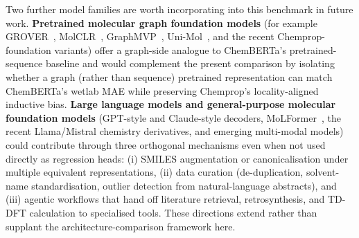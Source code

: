 \documentclass[journal=jcisd8,manuscript=article]{achemso}
\newcommand{\added}[1]{{\color{addedblue}#1}}
\begin{document}
\added{Two further model families are worth incorporating into this benchmark in future work. \textbf{Pretrained molecular graph foundation models} (for example GROVER~\cite{rong2020grover}, MolCLR~\cite{wang2022molecular}, GraphMVP~\cite{liu2021pretraining}, Uni-Mol~\cite{zhou2023unimol}, and the recent Chemprop-foundation variants) offer a graph-side analogue to ChemBERTa's pretrained-sequence baseline and would complement the present comparison by isolating whether a graph (rather than sequence) pretrained representation can match ChemBERTa's wetlab MAE while preserving Chemprop's locality-aligned inductive bias. \textbf{Large language models and general-purpose molecular foundation models} (GPT-style and Claude-style decoders, MoLFormer~\cite{ross2022molformer}, the recent Llama/Mistral chemistry derivatives, and emerging multi-modal models) could contribute through three orthogonal mechanisms even when not used directly as regression heads: (i) SMILES augmentation or canonicalisation under multiple equivalent representations, (ii) data curation (de-duplication, solvent-name standardisation, outlier detection from natural-language abstracts), and (iii) agentic workflows that hand off literature retrieval, retrosynthesis, and TD-DFT calculation to specialised tools. These directions extend rather than supplant the architecture-comparison framework here.}


\end{document}
